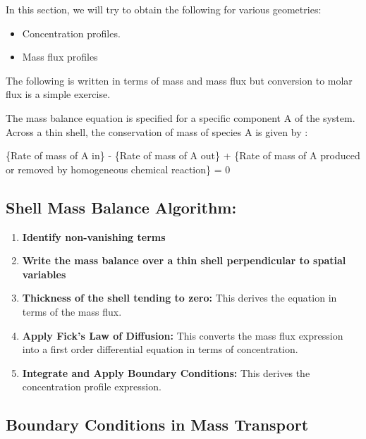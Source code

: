 In this section, we will try to obtain the following for various geometries:

\begin{itemize}

    \item Concentration profiles.

    \item Mass flux profiles

\end{itemize}

The following is written in terms of mass and mass flux but conversion to molar flux is a simple exercise.

The mass balance equation is specified for a specific component A of the system. Across a thin shell, the conservation of mass of species A is given by :

\{Rate of mass of A in\} - \{Rate of mass of A out\} + \{Rate of mass of A produced or removed by homogeneous chemical reaction\} = 0

\subsection{Shell Mass Balance Algorithm:}

\begin{enumerate}

    \item \textbf{Identify non-vanishing terms} 
    
    \item \textbf{Write the mass balance over a thin shell perpendicular to spatial variables}

\item \textbf{Thickness of the shell tending to zero:} This derives the equation in terms of the mass flux.

    \item \textbf{Apply Fick's Law of Diffusion:} This converts the mass flux expression into a first order differential equation in terms of concentration.

    \item \textbf{Integrate and Apply Boundary Conditions:} This derives the concentration profile expression.


\end{enumerate}

\subsection{Boundary Conditions in Mass Transport}

